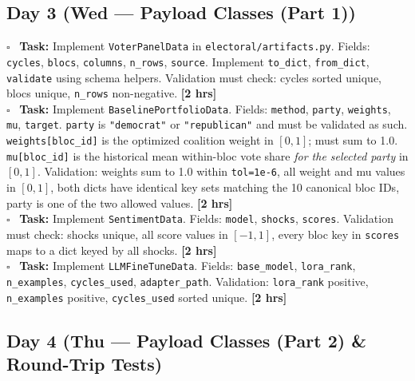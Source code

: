 \documentclass[11pt]{article}
\newcommand{\hrs}[1]{\textbf{[#1 hrs]}}
\newcommand{\dayhead}[2]{%
  \subsection*{Day #1 \normalfont\small\color{codegray}(#2)}}
\newcommand{\task}[2]{%
  \noindent\textbf{Task:} #1 \hfill \hrs{#2}\\}
\newcommand{\done}{\textcolor{sectionblue}{$\square$}\ }
\begin{document}
\dayhead{3}{Wed --- Payload Classes (Part 1)}

\begin{taskbox}
\done \task{Implement \texttt{VoterPanelData} in \texttt{electoral/artifacts.py}.
  Fields: \texttt{cycles}, \texttt{blocs}, \texttt{columns}, \texttt{n\_rows},
  \texttt{source}. Implement \texttt{to\_dict}, \texttt{from\_dict},
  \texttt{validate} using schema helpers. Validation must check: cycles sorted
  unique, blocs unique, \texttt{n\_rows} non-negative.}{2}

\done \task{Implement \texttt{BaselinePortfolioData}. Fields: \texttt{method},
  \texttt{party}, \texttt{weights}, \texttt{mu}, \texttt{target}.
  \texttt{party} is \texttt{"democrat"} or \texttt{"republican"} and must
  be validated as such. \texttt{weights[bloc\_id]} is the optimized coalition
  weight in $[0,1]$; must sum to 1.0. \texttt{mu[bloc\_id]} is the historical
  mean within-bloc vote share \emph{for the selected party} in $[0,1]$.
  Validation: weights sum to 1.0 within \texttt{tol=1e-6}, all weight and mu
  values in $[0,1]$, both dicts have identical key sets matching the 10
  canonical bloc IDs, party is one of the two allowed values.}{2}

\done \task{Implement \texttt{SentimentData}. Fields: \texttt{model},
  \texttt{shocks}, \texttt{scores}. Validation must check: shocks unique,
  all score values in $[-1, 1]$, every bloc key in \texttt{scores} maps to
  a dict keyed by all shocks.}{2}

\done \task{Implement \texttt{LLMFineTuneData}. Fields: \texttt{base\_model},
  \texttt{lora\_rank}, \texttt{n\_examples}, \texttt{cycles\_used},
  \texttt{adapter\_path}. Validation: \texttt{lora\_rank} positive,
  \texttt{n\_examples} positive, \texttt{cycles\_used} sorted unique.}{2}
\end{taskbox}

\dayhead{4}{Thu --- Payload Classes (Part 2) \& Round-Trip Tests}
\end{document}
